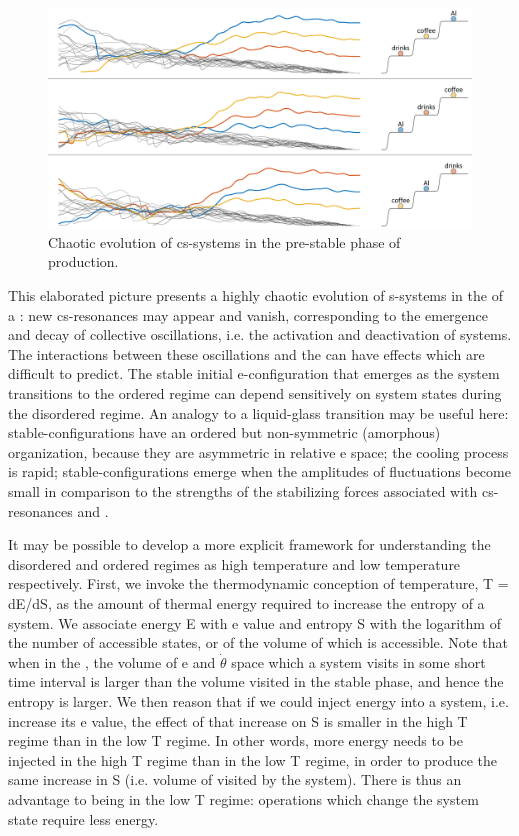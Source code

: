    
\begin{figure}
\includegraphics[width=\textwidth]{figures/Tilsen-img77.png}
\caption{Chaotic evolution of cs-systems in the pre-stable phase of production.}
\label{fig:4:27}
\end{figure}
 

  This elaborated picture presents a highly chaotic evolution of s-systems in the  of a : new cs-resonances may appear and vanish, corresponding to the emergence and decay of collective oscillations, i.e. the activation and deactivation of systems. The interactions between these oscillations and the  can have effects which are difficult to predict. The stable initial e-configuration that emerges as the system transitions to the ordered regime can depend sensitively on system states during the disordered regime. An analogy to a liquid-glass transition may be useful here: stable-configurations have an ordered but non-symmetric  (amorphous) organization, because they are asymmetric in relative e space; the cooling process is rapid; stable-configurations emerge when the amplitudes of fluctuations become small in comparison to the strengths of the stabilizing forces associated with cs-resonances and .

  It may be possible to develop a more explicit framework for understanding the disordered and ordered regimes as high temperature and low temperature respectively. First, we invoke the thermodynamic conception of temperature, T = dE/dS, as the amount of thermal energy required to increase the entropy of a system. We associate energy E with e value and entropy S with the logarithm of the number of accessible states, or of the volume of  which is accessible. Note that when in the , the volume of e and $\dot{\theta}$ space which a system visits in some short time interval is larger than the volume visited in the stable phase, and hence the entropy is larger. We then reason that if we could inject energy into a system, i.e. increase its e value, the effect of that increase on S is smaller in the high T regime than in the low T regime. In other words, more energy needs to be injected in the high T regime than in the low T regime, in order to produce the same increase in S (i.e. volume of  visited by the system). There is thus an advantage to being in the low T regime: operations which change the system state require less energy.

